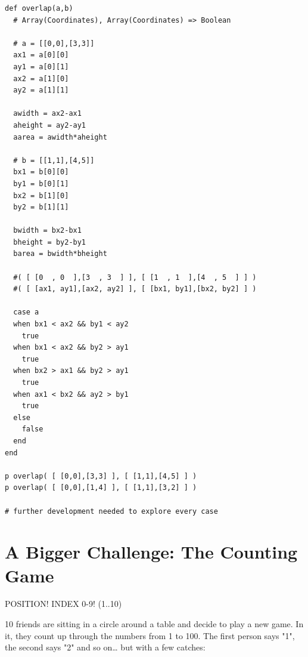 \documentclass[11pt]{article}
\begin{document}
\begin{verbatim}
def overlap(a,b)
  # Array(Coordinates), Array(Coordinates) => Boolean

  # a = [[0,0],[3,3]]
  ax1 = a[0][0]
  ay1 = a[0][1] 
  ax2 = a[1][0]
  ay2 = a[1][1]

  awidth = ax2-ax1
  aheight = ay2-ay1
  aarea = awidth*aheight

  # b = [[1,1],[4,5]]
  bx1 = b[0][0]
  by1 = b[0][1]
  bx2 = b[1][0]
  by2 = b[1][1]

  bwidth = bx2-bx1
  bheight = by2-by1
  barea = bwidth*bheight

  #( [ [0  , 0  ],[3  , 3  ] ], [ [1  , 1  ],[4  , 5  ] ] )
  #( [ [ax1, ay1],[ax2, ay2] ], [ [bx1, by1],[bx2, by2] ] )

  case a
  when bx1 < ax2 && by1 < ay2
    true
  when bx1 < ax2 && by2 > ay1
    true
  when bx2 > ax1 && by2 > ay1
    true
  when ax1 < bx2 && ay2 > by1
    true
  else
    false
  end
end

p overlap( [ [0,0],[3,3] ], [ [1,1],[4,5] ] )
p overlap( [ [0,0],[1,4] ], [ [1,1],[3,2] ] )

# further development needed to explore every case
\end{verbatim}

\section{A Bigger Challenge: The Counting Game}
\label{sec-2}

POSITION! INDEX 0-9! (1..10)

10 friends are sitting in a circle around a table and decide to play a new 
game. In it, they count up through the numbers from 1 to 100. The first person
says "1", the second says "2" and so on\ldots{} but with a few catches:
\end{document}
